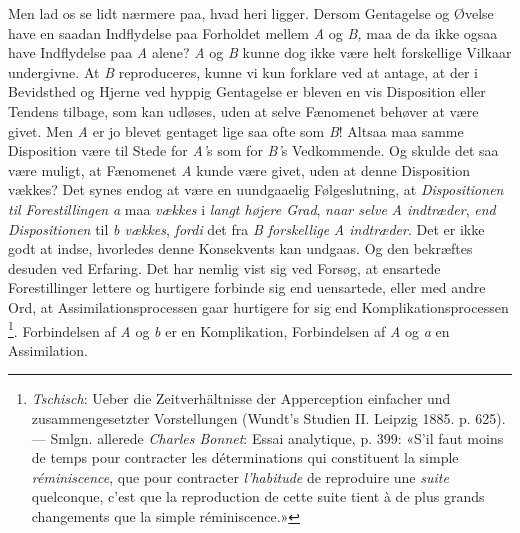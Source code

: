 \documentclass[12pt,a4paper,openany]{book}
\begin{document}
Men lad os se lidt nærmere paa, hvad heri ligger. Dersom Gentagelse og Øvelse
have en saadan Indflydelse paa Forholdet mellem \textit{A} og\textit{ B,} maa
de da ikke ogsaa have Indflydelse paa \textit{A} alene? \textit{A} og
\textit{B} kunne dog ikke være helt forskellige Vilkaar undergivne. At
\textit{B} reproduceres, kunne vi kun forklare ved at antage, at der i
Bevidsthed og Hjerne ved hyppig Gentagelse er bleven en vis Disposition eller
Tendens tilbage, som kan udløses, uden at selve Fænomenet behøver at være
givet. Men \textit{A} er jo blevet gentaget lige saa ofte som \textit{B}!
Altsaa maa samme Disposition være til Stede for \textit{A'}s som for
\textit{B'}s Vedkommende. Og skulde det saa være muligt, at Fænomenet
\textit{A} kunde være givet, uden at denne Disposition vækkes? Det synes endog
at være en uundgaaelig Følgeslutning, at \emph{Dispositionen til
Forestillingen} \textit{a} maa \emph{vækkes} i \emph{langt højere Grad},
\emph{naar selve} \textit{A indtræder}, \emph{end Dispositionen} til \textit{b
vækkes}, \emph{fordi} det fra \textit{B forskellige} \textit{A indtræder}. Det
er ikke godt at indse, hvorledes denne Konsekvents kan undgaas. Og den
bekræftes desuden ved Erfaring. Det har nemlig vist sig ved Forsøg, at
ensartede Forestillinger lettere og hurtigere forbinde sig end uensartede,
eller med andre Ord, at Assimilationsprocessen gaar hurtigere for sig end
Komplikationsprocessen%
\footnote[1]{\emph{Tschisch}: Ueber die Zeitverhältnisse der Apperception
einfacher und zusammengesetzter Vorstellungen (Wundt's Studien II. Leipzig
1885. p. 625). --- Smlgn. allerede \emph{Charles Bonnet}: Essai analytique, p.
399: «S'il faut moins de temps pour contracter les déterminations qui
constituent la simple \emph{réminiscence}, que pour contracter
\emph{l'habitude} de reproduire une \emph{suite} quelconque, c'est que la
reproduction de cette suite tient à de plus grands changements que la simple
réminiscence.»}. Forbindelsen af \textit{A} og\textit{ b} er en Komplikation,
Forbindelsen af \textit{A} og \textit{a} en Assimilation.
\end{document}
